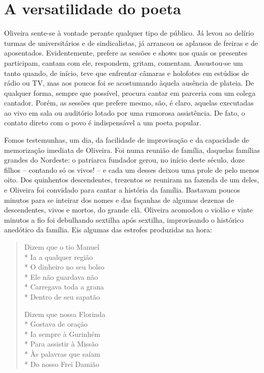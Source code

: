 \section{A versatilidade do poeta}

Oliveira sente-se à vontade perante qualquer tipo de
público. Já levou ao delírio turmas de universitários e de
sindicalistas, já arrancou os aplausos de freiras e de
aposentados. Evidentemente, prefere as sessões e shows
nos quais os presentes participam, cantam com ele,
respondem, gritam, comentam. Assustou-se um tanto
quando, de início, teve que enfrentar câmaras e holofotes
em estúdios de rádio ou TV, mas aos poucos foi se
acostumando àquela ausência de plateia. De qualquer
forma, sempre que possível, procura cantar em parceria
com um colega cantador. Porém, as sessões que prefere
mesmo, são, é claro, aquelas executadas ao vivo em sala
ou auditório lotado por uma rumorosa assistência. De fato,
o contato direto com o povo é indispensável a um poeta
popular.

Fomos testemunhas, um dia, da facilidade de
improvisação e da capacidade de memorização imediata
de Oliveira. Foi numa reunião de família, daquelas famílias
grandes do Nordeste: o patriarca fundador gerou, no início
deste século, doze filhos -- contando só os vivos! -- e cada
um desses deixou uma prole de pelo menos oito. Dos
quinhentos descendentes, trezentos se reuniram na fazenda
de um deles, e Oliveira foi convidado para cantar a história
da família. Bastavam poucos minutos para se inteirar dos
nomes e das façanhas de algumas dezenas de descendentes,
vivos e mortos, do grande clã. Oliveira acomodou o violão
e vinte minutos a fio foi debulhando sextilha após sextilha,
improvisando o histórico anedótico da família. Eis algumas
das estrofes produzidas na hora:

\begin{verse}

Dizem que o tio Manuel\\*
Ia a qualquer região\\*
O dinheiro no seu bolso\\*
Ele não guardava não\\*
Carregava toda a grana\\*
Dentro de seu sapatão

Dizem que nossa Florinda\\*
Gostava de oração\\*
Ia sempre à Gurinhém\\*
Para assistir à Missão\\*
Às palavras que saíam\\*
Do nosso Frei Damião

\end{verse}

